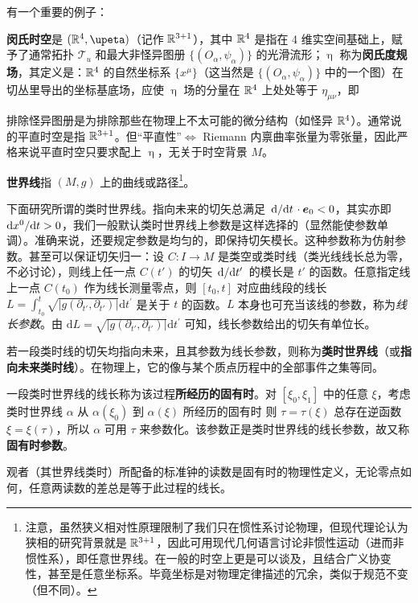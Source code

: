     有一个重要的例子：
    \begin{eg}
        \textbf{闵氏时空}是 $(\R^4,\upeta)$（记作 $\mathbb{R}^{3+1}$），其中 $\mathbb{R}^4$ 是指在 4 维实空间基础上，赋予了通常拓扑 $\mathcal T_u$ 和最大非怪异图册 $\{(O_\alpha,\psi_\alpha)\}$ 的光滑流形；$\upeta$ 称为\textbf{闵氏度规场}，其定义是：$\mathbb{R}^4$ 的自然坐标系 $\{x^\mu\}$（这当然是 $\{(O_\alpha,\psi_\alpha)\}$ 中的一个图）在切丛里导出的坐标基底场，应使 $\upeta$ 场的分量在 $\mathbb{R}^4$ 上处处等于 $\eta_{\mu\nu}$，即
    \end{eg}



    排除怪异图册是为排除那些在物理上不太可能的微分结构（如怪异 $\mathbb{R}^4$）。通常说的平直时空是指 $\mathbb{R}^{3+1}$。但“平直性”$\iff$ Riemann 内禀曲率张量为零张量，因此严格来说平直时空只要求配上 $\upeta$，无关于时空背景 $M$。

\begin{definition}
    \textbf{世界线}指 $(M,g)$ 上的曲线或路径\footnote{注意，虽然狭义相对性原理限制了我们只在惯性系讨论物理，但现代理论认为狭相的研究背景就是 $\mathbb{R}^{3+1}$，因此可用现代几何语言讨论非惯性运动（进而非惯性系），即任意世界线。在一般的时空上更是可以谈及，且结合广义协变性，甚至是任意坐标系。毕竟坐标是对物理定律描述的冗余，类似于规范不变（但不同）。}。
\end{definition}

下面研究所谓的类时世界线。指向未来的切矢总满足 $\dv*{t}\cdot\vb* e_0<0$，其实亦即 $\text dx^0/\text d t>0$，我们一般默认类时世界线上参数是这样选择的（显然能使参数单调）。准确来说，还要规定参数是均匀的，即保持切矢模长。这种参数称为仿射参数。甚至可以保证切矢归一：设 $C: I \rightarrow M$ 是类空或类时线（类光线线长总为零，不必讨论），则线上任一点 $C(t')$ 的切矢 $\dv*{t'}$ 的模长是 $t'$ 的函数。任意指定线上一点 $C\left(t_0\right)$ 作为线长测量零点，则 $[t_0,t]$ 对应曲线段的线长 $L=\int_{t_0}^t\sqrt{|g(\partial_{t'},\partial_{t'})|}\mathrm{d} t^{\prime}$ 是关于 $t$ 的函数。$L$ 本身也可充当该线的参数，称为\textit{线长参数}。由 $\mathrm{d} L=\sqrt{|g(\partial_{t'},\partial_{t'})|}\mathrm{d} t^{\prime}$ 可知，线长参数给出的切矢有单位长。

\begin{definition}
    若一段类时线的切矢均指向未来，且其参数为线长参数，则称为\textbf{类时世界线}（或\textbf{指向未来类时线}）。在物理上，它的像与某个质点历程中的全部事件之集等同。
\end{definition}
\begin{definition}
    一段类时世界线的线长称为该过程\textbf{所经历的固有时}。对 $\left[\xi_{0},\xi_{1}\right]$ 中的任意 $\xi$，考虑类时世界线 $\alpha$ 从 $\alpha\left(\xi_{0}\right)$ 到 $\alpha(\xi)$ 所经历的固有时
    则 $\tau={\tau}(\xi)$ 总存在逆函数 $\xi=\xi(\tau)$，所以 $\alpha$ 可用 $\tau$ 来参数化。该参数正是类时世界线的线长参数，故又称\textbf{固有时参数}。
\end{definition}
观者（其世界线类时）所配备的标准钟的读数是固有时的物理性定义，无论零点如何，任意两读数的差总是等于此过程的线长。





